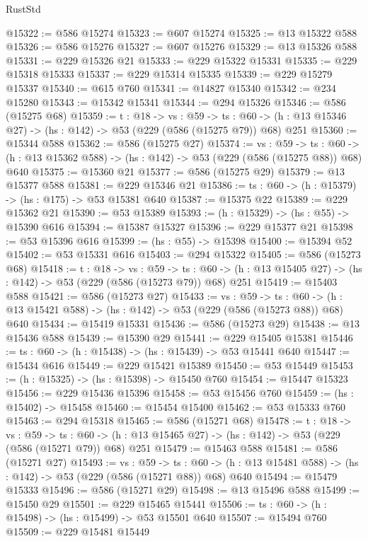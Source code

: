 \begin{lexlean}{RustStd}
\begin{coremodule}
@15322 := @586 @15274
@15323 := @607 @15274
@15325 := @13 @15322 @588
@15326 := @586 @15276
@15327 := @607 @15276
@15329 := @13 @15326 @588
@15331 := @229 @15326 @21
@15333 := @229 @15322 @15331
@15335 := @229 @15318 @15333
@15337 := @229 @15314 @15335
@15339 := @229 @15279 @15337
@15340 := @615 @760
@15341 := @14827 @15340
@15342 := @234 @15280
@15343 := @15342 @15341
@15344 := @294 @15326
@15346 := @586 (@15275 @68)
@15359 := {t : @18} ->
  {vs : @59} ->
  {ts : @60} -> (h : @13 @15346 @27) -> (hs : @142) -> @53 (@229 (@586 (@15275 @79)) @68) @251
@15360 := @15344 @588
@15362 := @586 (@15275 @27)
@15374 := {vs : @59} ->
  {ts : @60} -> (h : @13 @15362 @588) -> (hs : @142) -> @53 (@229 (@586 (@15275 @88)) @68) @640
@15375 := @15360 @21
@15377 := @586 (@15275 @29)
@15379 := @13 @15377 @588
@15381 := @229 @15346 @21
@15386 := {ts : @60} -> (h : @15379) -> (hs : @175) -> @53 @15381 @640
@15387 := @15375 @22
@15389 := @229 @15362 @21
@15390 := @53 @15389
@15393 := (h : @15329) -> (hs : @55) -> @15390 @616
@15394 := @15387 @15327
@15396 := @229 @15377 @21
@15398 := @53 @15396 @616
@15399 := (hs : @55) -> @15398
@15400 := @15394 @52
@15402 := @53 @15331 @616
@15403 := @294 @15322
@15405 := @586 (@15273 @68)
@15418 := {t : @18} ->
  {vs : @59} ->
  {ts : @60} -> (h : @13 @15405 @27) -> (hs : @142) -> @53 (@229 (@586 (@15273 @79)) @68) @251
@15419 := @15403 @588
@15421 := @586 (@15273 @27)
@15433 := {vs : @59} ->
  {ts : @60} -> (h : @13 @15421 @588) -> (hs : @142) -> @53 (@229 (@586 (@15273 @88)) @68) @640
@15434 := @15419 @15331
@15436 := @586 (@15273 @29)
@15438 := @13 @15436 @588
@15439 := @15390 @29
@15441 := @229 @15405 @15381
@15446 := {ts : @60} -> (h : @15438) -> (hs : @15439) -> @53 @15441 @640
@15447 := @15434 @616
@15449 := @229 @15421 @15389
@15450 := @53 @15449
@15453 := (h : @15325) -> (hs : @15398) -> @15450 @760
@15454 := @15447 @15323
@15456 := @229 @15436 @15396
@15458 := @53 @15456 @760
@15459 := (hs : @15402) -> @15458
@15460 := @15454 @15400
@15462 := @53 @15333 @760
@15463 := @294 @15318
@15465 := @586 (@15271 @68)
@15478 := {t : @18} ->
  {vs : @59} ->
  {ts : @60} -> (h : @13 @15465 @27) -> (hs : @142) -> @53 (@229 (@586 (@15271 @79)) @68) @251
@15479 := @15463 @588
@15481 := @586 (@15271 @27)
@15493 := {vs : @59} ->
  {ts : @60} -> (h : @13 @15481 @588) -> (hs : @142) -> @53 (@229 (@586 (@15271 @88)) @68) @640
@15494 := @15479 @15333
@15496 := @586 (@15271 @29)
@15498 := @13 @15496 @588
@15499 := @15450 @29
@15501 := @229 @15465 @15441
@15506 := {ts : @60} -> (h : @15498) -> (hs : @15499) -> @53 @15501 @640
@15507 := @15494 @760
@15509 := @229 @15481 @15449

\end{coremodule}
\end{lexlean}
